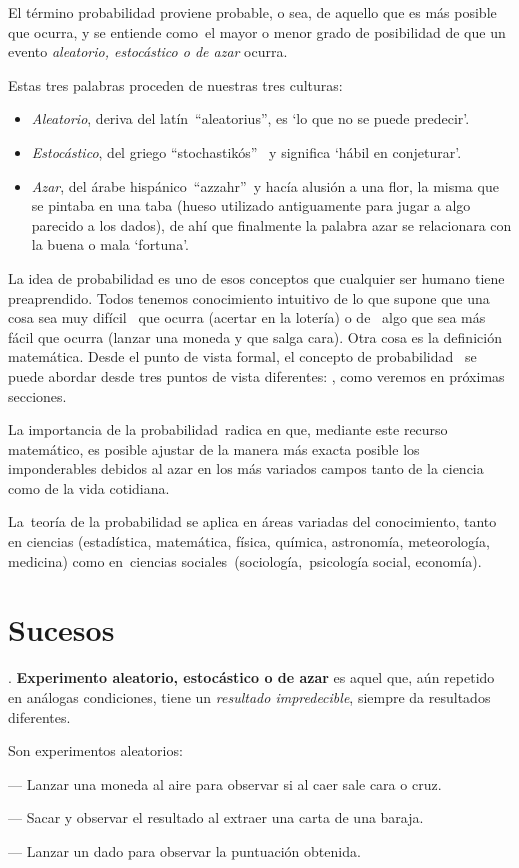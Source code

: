 El término probabilidad proviene probable, o sea, de aquello que es más posible que ocurra, y se entiende como el mayor o menor grado de posibilidad de que un evento \emph{aleatorio, estocástico o de azar} ocurra.

Estas tres palabras proceden de nuestras tres culturas:

\begin{itemize}
\item \emph{Aleatorio}, deriva del latín ``aleatorius'', es  `lo que no se puede predecir'. 

\item \emph{Estocástico}, del griego ``stochastikós''  y significa `hábil en conjeturar'.

\item \emph{Azar}, del árabe hispánico ``azzahr'' y hacía alusión a una flor, la misma que se pintaba en una taba (hueso utilizado antiguamente para jugar a algo parecido a los dados), de ahí que finalmente la palabra azar se relacionara con la buena o mala `fortuna'.
\end{itemize}

La idea de probabilidad es uno de esos conceptos que cualquier ser humano tiene preaprendido. Todos tenemos conocimiento intuitivo de lo que supone que una cosa sea muy difícil  que ocurra (acertar en la lotería) o de  algo que sea más fácil que ocurra (lanzar una moneda y que salga cara). Otra cosa es la definición matemática. Desde el punto de vista formal, el concepto de probabilidad  se puede abordar desde tres puntos de vista diferentes: , como veremos en próximas secciones.


La importancia de la probabilidad radica en que, mediante este recurso matemático, es posible ajustar de la manera más exacta posible los imponderables debidos al azar en los más variados campos tanto de la ciencia como de la vida cotidiana.

La teoría de la probabilidad se aplica en áreas variadas del conocimiento, tanto en ciencias (estadística, matemática, física, química, astronomía, meteorología, medicina) como en ciencias sociales (sociología, psicología social, economía).

\section{Sucesos}

\begin{definition}
.	\textbf{Experimento aleatorio, estocástico o de azar} es aquel que, aún repetido en análogas condiciones, tiene un \emph{resultado impredecible}, siempre da resultados diferentes.

Son experimentos aleatorios:

--- Lanzar una moneda al aire para observar si al caer sale cara o cruz.

--- Sacar y observar el resultado al extraer una carta de una baraja.

--- Lanzar un dado para observar la puntuación obtenida.

\end{definition}


